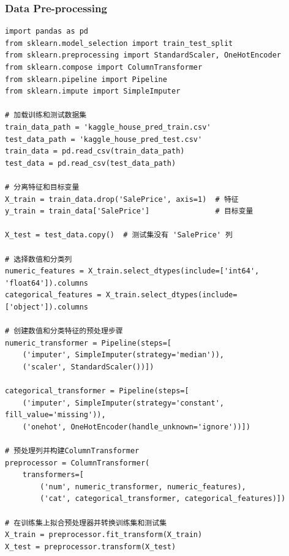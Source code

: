 \documentclass[a4paper,12pt]{article}
\begin{document}
\subsubsection{Data Pre-processing}
\begin{lstlisting}
import pandas as pd
from sklearn.model_selection import train_test_split
from sklearn.preprocessing import StandardScaler, OneHotEncoder
from sklearn.compose import ColumnTransformer
from sklearn.pipeline import Pipeline
from sklearn.impute import SimpleImputer

# 加载训练和测试数据集
train_data_path = 'kaggle_house_pred_train.csv'
test_data_path = 'kaggle_house_pred_test.csv'
train_data = pd.read_csv(train_data_path)
test_data = pd.read_csv(test_data_path)

# 分离特征和目标变量
X_train = train_data.drop('SalePrice', axis=1)  # 特征
y_train = train_data['SalePrice']               # 目标变量

X_test = test_data.copy()  # 测试集没有 'SalePrice' 列

# 选择数值和分类列
numeric_features = X_train.select_dtypes(include=['int64', 'float64']).columns
categorical_features = X_train.select_dtypes(include=['object']).columns

# 创建数值和分类特征的预处理步骤
numeric_transformer = Pipeline(steps=[
    ('imputer', SimpleImputer(strategy='median')),
    ('scaler', StandardScaler())])

categorical_transformer = Pipeline(steps=[
    ('imputer', SimpleImputer(strategy='constant', fill_value='missing')),
    ('onehot', OneHotEncoder(handle_unknown='ignore'))])

# 预处理列并构建ColumnTransformer
preprocessor = ColumnTransformer(
    transformers=[
        ('num', numeric_transformer, numeric_features),
        ('cat', categorical_transformer, categorical_features)])

# 在训练集上拟合预处理器并转换训练集和测试集
X_train = preprocessor.fit_transform(X_train)
X_test = preprocessor.transform(X_test)
\end{lstlisting}
\end{document}
